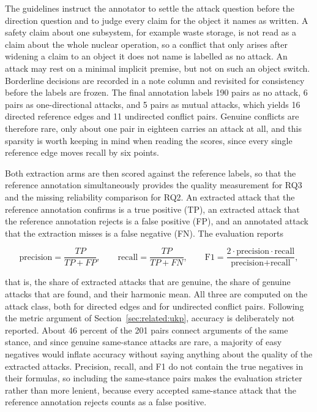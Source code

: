 The guidelines instruct the annotator to settle the attack question before the
direction question and to judge every claim for the object it names as
written. A safety claim about one subsystem, for example waste storage, is not
read as a claim about the whole nuclear operation, so a conflict that only
arises after widening a claim to an object it does not name is labelled as no
attack. An attack may rest on a minimal implicit premise, but not on such an
object switch. Borderline decisions are recorded in a note column and revisited
for consistency before the labels are frozen. The final annotation labels 190
pairs as no attack, 6 pairs as one-directional attacks, and 5 pairs as mutual
attacks, which yields 16 directed reference edges and 11 undirected conflict pairs.
Genuine conflicts are therefore rare, only about one pair in eighteen carries
an attack at all, and this sparsity is worth keeping in mind when reading the
scores, since every single reference edge moves recall by six points.

Both extraction arms are then scored against the reference labels, so that the
reference annotation simultaneously provides the quality measurement for RQ3 and the
missing reliability comparison for RQ2. An extracted attack that the reference
annotation confirms is a true positive (TP), an extracted attack that the reference
annotation rejects is a false positive (FP), and an annotated attack that the
extraction misses is a false negative (FN). The evaluation reports

\begin{equation*}
\text{precision} = \frac{TP}{TP + FP}, \qquad
\text{recall} = \frac{TP}{TP + FN}, \qquad
\text{F1} = \frac{2 \cdot \text{precision} \cdot \text{recall}}
                 {\text{precision} + \text{recall}},
\end{equation*}

\noindent
that is, the share of extracted attacks that are genuine, the share of genuine
attacks that are found, and their harmonic mean. All three are computed on the
attack class, both for directed edges and for undirected conflict pairs.
Following the metric argument of Section~\ref{sec:related:ukp}, accuracy is
deliberately not reported. About 46 percent of the 201 pairs connect arguments
of the same stance, and since genuine same-stance attacks are rare, a majority
of easy negatives would inflate accuracy without saying anything about the
quality of the extracted attacks. Precision, recall, and F1 do not contain the
true negatives in their formulas, so including the same-stance pairs makes the
evaluation stricter rather than more lenient, because every accepted
same-stance attack that the reference annotation rejects counts as a false positive.

